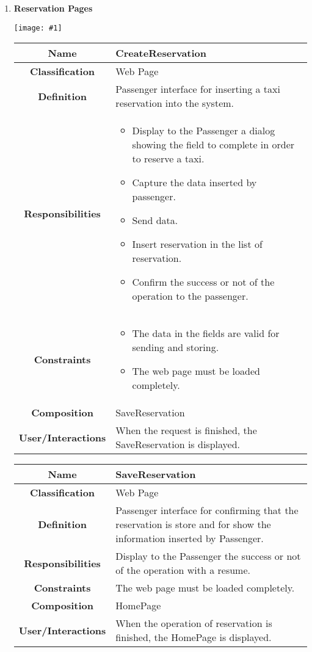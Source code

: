 \documentclass[11pt, a4paper,titlepage]{article}
\newcommand{\image}[1]{
	\begin{center}
		\noindent \texttt{[image: \#1]}
	\end{center}
	}
\begin{document}
\begin{enumerate}
\newpage
\item \textbf{Reservation Pages}\\
\image{page_reservation.png}
\begin{tabularx}{\textwidth}{| c | X |}
	\hline
	\textbf{Name} & 
	CreateReservation
	\\
	\hline
	\textbf{Classification} & 
	Web Page
	\\
	\hline
	\textbf{Definition} & 
	Passenger interface for inserting a taxi reservation into the system.\\
	\hline
	\textbf{Responsibilities} &
	\begin{itemize}
		\item Display to the Passenger a dialog showing the field to complete in order to reserve a taxi.
		\item Capture the data inserted by passenger.
		\item Send data.
		\item Insert reservation in the list of reservation.
		\item Confirm the success or not of the operation to the passenger.
	\end{itemize}
	\\
	\hline
	\textbf{Constraints} & 
	\begin{itemize}
		\item The data in the fields are valid for sending and storing.
		\item The web page must be loaded completely.
	\end{itemize}
	\\
	\hline
	\textbf{Composition} & 
	SaveReservation
	\\
	\hline
	\textbf{User/Interactions} & 
	When the request is finished, the SaveReservation is displayed.
	\\
	\hline	
\end{tabularx}

\begin{tabularx}{\textwidth}{| c | X |}
	\hline
	\textbf{Name} & 
	SaveReservation
	\\
	\hline
	\textbf{Classification} & 
	Web Page
	\\
	\hline
	\textbf{Definition} & 
	Passenger interface for confirming that the reservation is store and for show the information inserted by Passenger.
	\\
	\hline
	\textbf{Responsibilities} &
	Display to the Passenger the success or not of the operation with a resume.
	\\
	\hline
	\textbf{Constraints} & 
	The web page must be loaded completely.
	\\
	\hline
	\textbf{Composition} & 
	HomePage
	\\
	\hline
	\textbf{User/Interactions} & 
	When the operation of reservation is finished, the HomePage is displayed.
	\\
	\hline	
\end{tabularx}


\end{enumerate}
\end{document}

